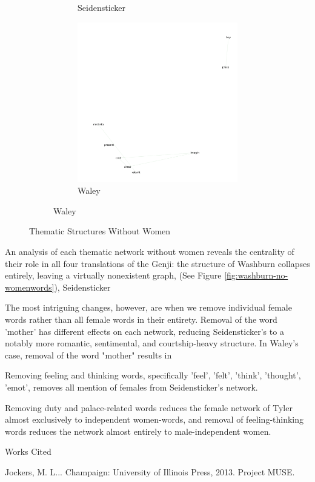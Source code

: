 \documentclass[12pt]{article}
\newcommand{\bibent}{\noindent \hangindent 40pt}
\newenvironment{workscited}{\newpage \begin{center} Works Cited \end{center}}{\newpage }
\begin{document}
\begin{flushleft}
\begin{spacing}{2.0}
\begin{figure}
\begin{subfigure}{\linewidth}
\begin{subfigure}{.5\linewidth}
			\caption{Seidensticker}
		\end{subfigure}
		\begin{subfigure}{.5\linewidth}
			\includegraphics[width=3in]{waley-no-womenwords.png}
			\caption{Waley}
		\end{subfigure}
	\end{subfigure}
	\caption{Thematic Structures Without Women}
	\label{networks-without-women}
\end{figure}

An analysis of each thematic network without women reveals the centrality of their role in all four translations of the Genji: the structure of Washburn collapses entirely, leaving a virtually nonexistent graph, (See Figure \ref{fig:washburn-no-womenwords}), Seidensticker

The most intriguing changes, however, are when we remove individual female words rather than all female words in their entirety. Removal of the word 'mother' has different effects on each network, reducing Seidensticker's to a notably more romantic, sentimental, and courtship-heavy structure. In Waley's case, removal of the word "mother" results in

Removing feeling and thinking words, specifically 'feel', 'felt', 'think', 'thought', 'emot', removes all mention of females from Seidensticker's network.

Removing duty and palace-related words reduces the female network of Tyler almost exclusively to independent women-words, and removal of feeling-thinking words reduces the network almost entirely to male-independent women.
\begin{workscited}

\bibent Jockers, M. L... Champaign: University of Illinois Press, 2013. Project MUSE.


\end{workscited}
\end{spacing}
\end{flushleft}
\end{document}
